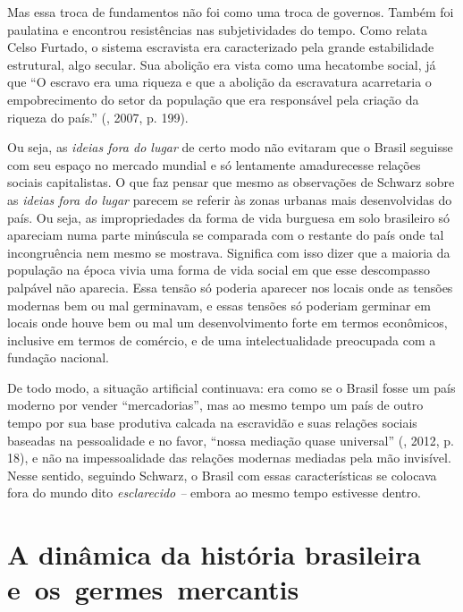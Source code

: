 {Mas essa troca de fundamentos não foi como uma troca de governos. Também
foi paulatina e encontrou resistências nas subjetividades do tempo. Como
relata Celso Furtado, o sistema escravista era caracterizado pela grande
estabilidade estrutural, algo secular. Sua abolição era vista como uma
hecatombe social, já que ``O escravo era uma riqueza e que a abolição da
escravatura acarretaria o empobrecimento do setor da população que era
responsável pela criação da riqueza do país.'' (, 2007, p. 199).

Ou seja, as \emph{ideias fora do lugar} de certo modo não evitaram que o
Brasil seguisse com seu espaço no mercado mundial e só lentamente
amadurecesse relações sociais capitalistas. O que faz pensar que mesmo
as observações de Schwarz sobre as \emph{ideias fora do lugar} parecem
se referir às zonas urbanas mais desenvolvidas do país. Ou seja, as
impropriedades da forma de vida burguesa em solo brasileiro só apareciam
numa parte minúscula se comparada com o restante do país onde tal
incongruência nem mesmo se mostrava. Significa com isso dizer que a
maioria da população na época vivia uma forma de vida social em que esse
descompasso palpável não aparecia. Essa tensão só poderia aparecer nos locais
onde as tensões modernas bem ou mal germinavam, e essas tensões só
poderiam germinar em locais onde houve bem ou mal um desenvolvimento
forte em termos econômicos, inclusive em termos de comércio, e de uma
intelectualidade preocupada com a fundação nacional.

De todo modo, a situação artificial continuava: era como se o Brasil
fosse um país moderno por vender ``mercadorias'', mas ao mesmo tempo um
país de outro tempo por sua base produtiva calcada na escravidão e suas
relações sociais baseadas na pessoalidade e no favor, ``nossa mediação
quase universal'' (, 2012, p. 18), e não na impessoalidade das
relações modernas mediadas pela mão invisível. Nesse sentido,
seguindo Schwarz, o Brasil com essas características se colocava fora do
mundo dito \emph{esclarecido --} embora ao mesmo tempo estivesse dentro.

\section{A dinâmica da história brasileira e~os~germes~mercantis}

}
